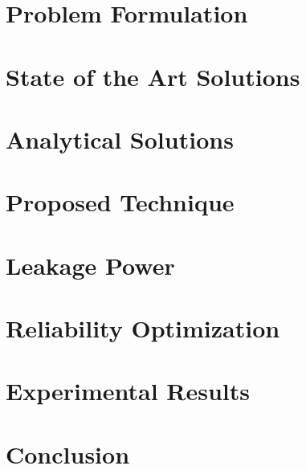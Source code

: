 \documentclass{sig-alternate}
\begin{document}
  \section{Problem Formulation} \label{sec:problem}
  

  \section{State of the Art Solutions} \label{sec:hotspot-solution}
  

  \section{Analytical Solutions} \label{sec:analytical-solution}
  

  \section{Proposed Technique} \label{sec:condensed-equation}
  

  \section{Leakage Power} \label{sec:leakage}
  

  \section{Reliability Optimization} \label{sec:reliability}
  

  \section{Experimental Results} \label{sec:results}
  

  \section{Conclusion} \label{sec:conclusion}
  

%
  
\end{document}
